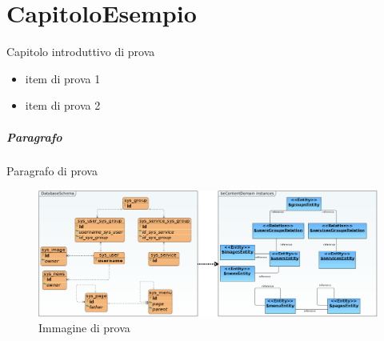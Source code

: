 \chapter{CapitoloEsempio}
Capitolo introduttivo di prova
\begin{itemize}
 \item item di prova 1
 \item item di prova 2
\end{itemize}

\paragraph{Paragrafo}
 Paragrafo di prova
 \begin{figure}[h!]
	    \centering
	    \includegraphics[width=\textwidth,keepaspectratio=true]{capitoli/imgs/SystemDomain.png}
	    \caption{Immagine di prova}
\end{figure}